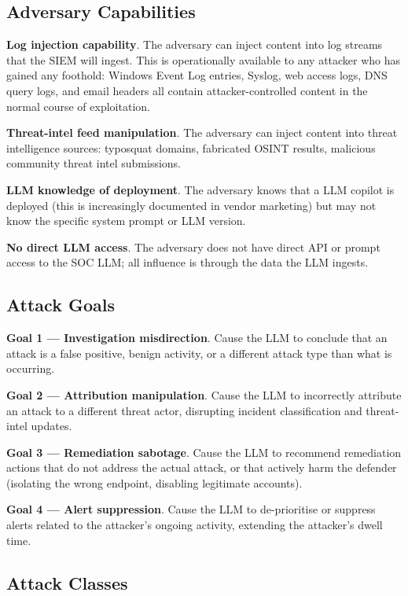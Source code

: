 \documentclass[sigconf,nonacm]{acmart}
\begin{document}
\subsection{Adversary Capabilities}

\textbf{Log injection capability}. The adversary can inject
content into log streams that the SIEM will ingest. This is
operationally available to any attacker who has gained any
foothold: Windows Event Log entries, Syslog, web access logs,
DNS query logs, and email headers all contain
attacker-controlled content in the normal course of exploitation.

\textbf{Threat-intel feed manipulation}. The adversary can
inject content into threat intelligence sources: typosquat
domains, fabricated OSINT results, malicious community threat
intel submissions.

\textbf{LLM knowledge of deployment}. The adversary knows that
a LLM copilot is deployed (this is increasingly documented in
vendor marketing) but may not know the specific system prompt
or LLM version.

\textbf{No direct LLM access}. The adversary does not have direct
API or prompt access to the SOC LLM; all influence is through
the data the LLM ingests.

\subsection{Attack Goals}

\textbf{Goal 1 --- Investigation misdirection}. Cause the LLM
to conclude that an attack is a false positive, benign activity,
or a different attack type than what is occurring.

\textbf{Goal 2 --- Attribution manipulation}. Cause the LLM to
incorrectly attribute an attack to a different threat actor,
disrupting incident classification and threat-intel updates.

\textbf{Goal 3 --- Remediation sabotage}. Cause the LLM to
recommend remediation actions that do not address the actual
attack, or that actively harm the defender (isolating the
wrong endpoint, disabling legitimate accounts).

\textbf{Goal 4 --- Alert suppression}. Cause the LLM to
de-prioritise or suppress alerts related to the attacker's
ongoing activity, extending the attacker's dwell time.

\subsection{Attack Classes}
\end{document}
